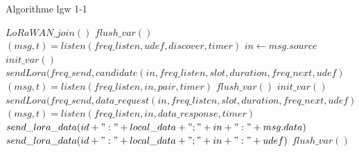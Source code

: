 \documentclass[11pt]{article}
\begin{document}
\begin{algorithm}
\caption{Algorithme lgw 1-1}\label{alg:lgw1-1}
\begin{algorithmic}[1]
\State $LoRaWAN\_join()$
\State $flush\_var()$
    \State $(msg,t) = listen(freq\_listen,udef,discover,timer)$
  \EndIf
    \State $in \leftarrow msg.source$
    \State $init\_var()$
    \State $sendLora(freq\_send,candidate(in,freq\_listen,slot,duration,freq\_next,udef)$
    \State $(msg,t) = listen(freq\_listen,in,pair,timer)$
      \State $flush\_var()$
    \EndIf
  \EndIf
    \State $init\_var()$
    \State $sendLora(freq\_send,data\_request(in,freq\_listen,slot,duration,freq\_next,udef)$
    \State $(msg,t) = listen(freq\_listen,in,data\_response,timer)$
      \State $send\_lora\_data(id + ":" + local\_data + ";" + in + ":" + msg.data)$
    \Else
      \State $send\_lora\_data(id + ":" + local\_data + ";" + in + ":" + udef)$
      \State $flush\_var()$
    \EndIf
  \EndIf
\EndWhile
\end{algorithmic}
\end{algorithm}
\end{document}
